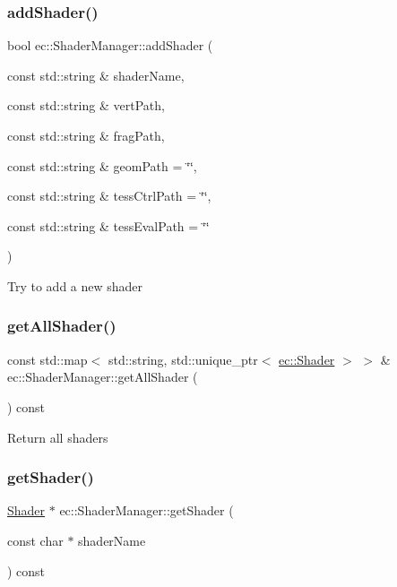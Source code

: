 \subsubsection{\texorpdfstring{add\+Shader()}{addShader()}}
{\footnotesize\ttfamily bool ec\+::\+Shader\+Manager\+::add\+Shader (\begin{DoxyParamCaption}\item[{const std\+::string \&}]{shader\+Name,  }\item[{const std\+::string \&}]{vert\+Path,  }\item[{const std\+::string \&}]{frag\+Path,  }\item[{const std\+::string \&}]{geom\+Path = {\ttfamily \char`\"{}\char`\"{}},  }\item[{const std\+::string \&}]{tess\+Ctrl\+Path = {\ttfamily \char`\"{}\char`\"{}},  }\item[{const std\+::string \&}]{tess\+Eval\+Path = {\ttfamily \char`\"{}\char`\"{}} }\end{DoxyParamCaption})}

Try to add a new shader \mbox{\label{classec_1_1_shader_manager_aaff28268f21b821c048f351684a0213f}} 
\subsubsection{\texorpdfstring{get\+All\+Shader()}{getAllShader()}}
{\footnotesize\ttfamily const std\+::map$<$ std\+::string, std\+::unique\+\_\+ptr$<$ \mbox{\hyperlink{classec_1_1_shader}{ec\+::\+Shader}} $>$ $>$ \& ec\+::\+Shader\+Manager\+::get\+All\+Shader (\begin{DoxyParamCaption}{ }\end{DoxyParamCaption}) const}

Return all shaders \mbox{\label{classec_1_1_shader_manager_a3e1390b9c15a6809ef07a10bac4112c7}} 
\subsubsection{\texorpdfstring{get\+Shader()}{getShader()}}
{\footnotesize\ttfamily \mbox{\hyperlink{classec_1_1_shader}{Shader}} $\ast$ ec\+::\+Shader\+Manager\+::get\+Shader (\begin{DoxyParamCaption}\item[{const char $\ast$}]{shader\+Name }\end{DoxyParamCaption}) const}

